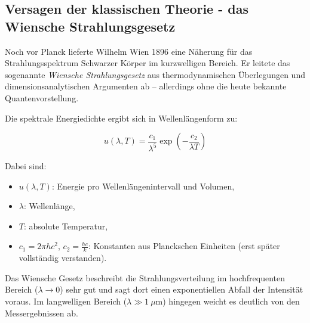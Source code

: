 \subsection{Versagen der klassischen Theorie - \newline das Wiensche Strahlungsgesetz}

Noch vor Planck lieferte Wilhelm Wien 1896 eine Näherung für das Strahlungsspektrum Schwarzer Körper im kurzwelligen Bereich. Er leitete das sogenannte \emph{Wiensche Strahlungsgesetz} aus thermodynamischen Überlegungen und dimensionsanalytischen Argumenten ab – allerdings ohne die heute bekannte Quantenvorstellung.

Die spektrale Energiedichte ergibt sich in Wellenlängenform zu:

\[
u(\lambda, T) = \frac{c_1}{\lambda^5} \exp\left(-\frac{c_2}{\lambda T}\right)
\]

Dabei sind:
\begin{itemize}
	\item \( u(\lambda, T) \): Energie pro Wellenlängenintervall und Volumen,
	\item \( \lambda \): Wellenlänge,
	\item \( T \): absolute Temperatur,
	\item \( c_1 = 2\pi h c^2 \), \( c_2 = \frac{hc}{k} \): Konstanten aus Planckschen Einheiten (erst später vollständig verstanden).
\end{itemize}

Das Wiensche Gesetz beschreibt die Strahlungsverteilung im hochfrequenten Bereich (\( \lambda \to 0 \)) sehr gut und sagt dort einen exponentiellen Abfall der Intensität voraus. Im langwelligen Bereich (\( \lambda \gg 1\ \mu\mathrm{m} \)) hingegen weicht es deutlich von den Messergebnissen ab.

